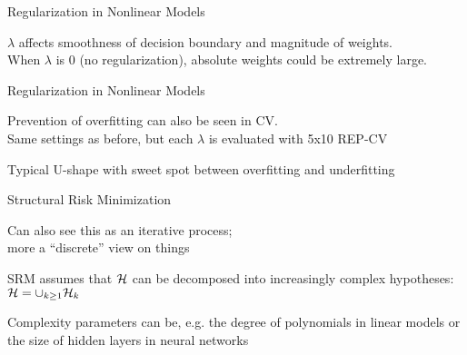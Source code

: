 \documentclass[11pt,compress,t,notes=noshow, xcolor=table]{beamer}
\begin{document}
\begin{frame}{Regularization in Nonlinear Models}

{
}



{\small
$\lambda$ affects smoothness of decision boundary and magnitude of weights.\\
When $\lambda$ is 0 (no regularization), absolute weights could be extremely large.
}

\end{frame}

\begin{frame}{Regularization in Nonlinear Models}

Prevention of overfitting can also be seen in CV.\\
Same settings as before, but each $\lambda$ is evaluated with
5x10 REP-CV


Typical U-shape with sweet spot between overfitting and underfitting
\end{frame}


\begin{framei}[sep=L]{Structural Risk Minimization}

  \item Can also see this as an iterative process;\\
  more a ``discrete'' view on things
  \item SRM assumes that $\mathcal{H}$ can be decomposed into increasingly complex hypotheses: 
  $\mathcal{H} = \cup_{k \geq 1 }\mathcal{H}_{k}$
  \item Complexity parameters can be, e.g. the degree of polynomials in linear models or the size of hidden layers in neural networks

\vfill




\end{framei}
\end{document}
